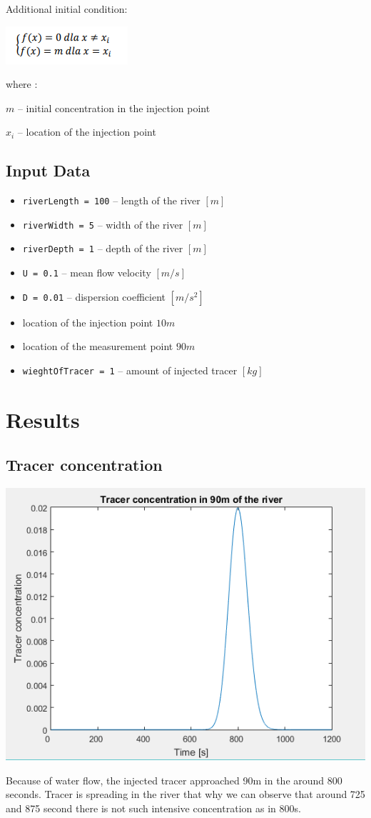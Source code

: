 \documentclass[a4paper,12pt]{article}
\begin{document}
Additional initial condition:
\\
\centerline{\includegraphics[scale=1]{initialCond.png}}
where :
\begin{description}
\item $m$ -- initial concentration in the injection point
\item $x_i$ --  location of the injection point
\end{description}
\subsection{Input Data}
\begin{itemize}
\item \verb!riverLength = 100! -- length of the river $[m]$ 
\item \verb!riverWidth = 5! -- width of the river $[m]$
\item \verb!riverDepth = 1! -- depth of the river $[m]$
\item \verb!U = 0.1! -- mean flow velocity $[m/s]$
\item \verb!D = 0.01! -- dispersion coefficient $[m/s^2]$
\item location of the injection point $10m$
\item location of the measurement point $90m$
\item \verb!wieghtOfTracer = 1! -- amount of injected tracer $[kg]$
\end{itemize}
\section{Results}
\subsection{Tracer concentration}
\centerline{\includegraphics[scale=1]{tracerConcetration}}
Because of water flow, the injected tracer approached 90m in the around 800 seconds. Tracer is spreading in the river that why we can observe that around 725 and 875 second there is not such intensive concentration as in 800s.
\end{document}
